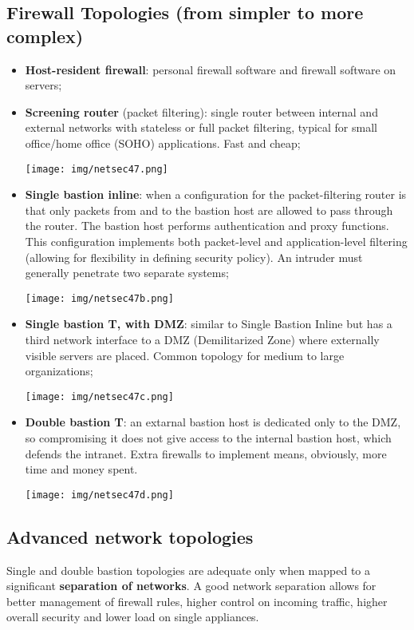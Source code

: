 \documentclass[a4paper, 10pt, titlepage]{article}
\begin{document}
\subsection*{Firewall Topologies (from simpler to more complex)}
\begin{itemize}
	\item \textbf{Host-resident firewall}: personal firewall software and firewall software on servers;
	\item \textbf{Screening router} (packet filtering): single router between internal and external networks with stateless or full packet filtering, typical for small office/home office (SOHO) applications. Fast and cheap;
	\begin{center}
		\texttt{[image: img/netsec47.png]}
	\end{center}
	\item \textbf{Single bastion inline}: when a configuration for the packet-filtering router is that only packets from and to the bastion host are allowed to pass through the router. The bastion host performs authentication and proxy functions. This configuration implements both packet-level and application-level filtering (allowing for flexibility in defining security policy). An intruder must generally penetrate two separate systems;
	\begin{center}
		\texttt{[image: img/netsec47b.png]}
	\end{center}
	\item \textbf{Single bastion T, with DMZ}: similar to Single Bastion Inline but has a third network interface to a DMZ (Demilitarized Zone) where externally visible servers are placed. Common topology for medium to large organizations;
	\begin{center}
		\texttt{[image: img/netsec47c.png]}
	\end{center}
	\item \textbf{Double bastion T}: an extarnal bastion host is dedicated only to the DMZ, so compromising it does not give access to the internal bastion host, which defends the intranet. Extra firewalls to implement means, obviously, more time and money spent.
	\begin{center}
		\texttt{[image: img/netsec47d.png]}
	\end{center}
\end{itemize}

\subsection*{Advanced network topologies}
Single and double bastion topologies are adequate only when mapped to a significant \textbf{separation of networks}. A good network separation allows for better management of firewall rules, higher control on incoming traffic, higher overall security and lower load on single appliances.
\end{document}
